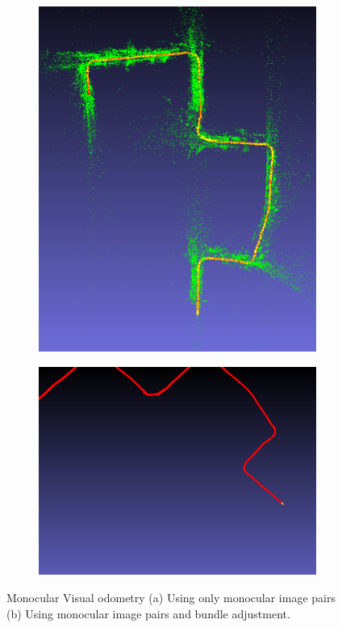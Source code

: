 \documentclass{article}
\begin{document}
   
\begin{figure}    
    \begin{subfigure}[b]{.45\textwidth}
    \centering
        \includegraphics[height=0.7\linewidth]{./vo_mono_3.png}
        \caption{}
        \label{fig:mono}
    \end{subfigure}
    \begin{subfigure}[b]{.45\textwidth}
    \centering
        \includegraphics[height=0.7\linewidth]{./mono-ba.png}
        \caption{}
        \label{fig:monoba}
    \end{subfigure}
    \caption{Monocular Visual odometry (a) Using only monocular image pairs (b) Using monocular image pairs and bundle adjustment.}
\end{figure}
\end{document}
